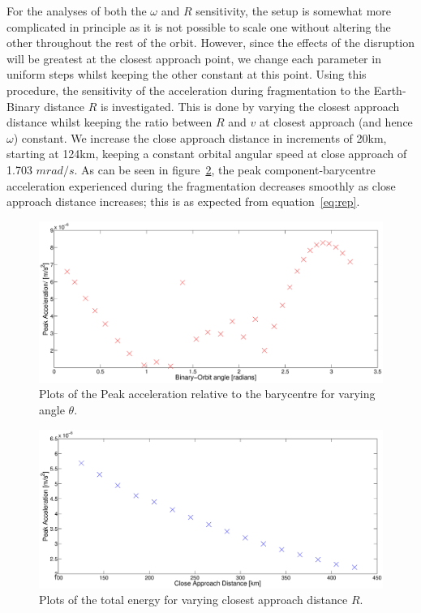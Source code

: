 \documentclass[letterpaper, preprint, paper,11pt]{AAS}	%
\begin{document}
For the analyses of both the $\omega$ and $R$ sensitivity, the setup is somewhat more complicated in principle as it is not possible to scale one without altering the other throughout the rest of the orbit. However, since the effects of the disruption will be greatest at the closest approach point, we change each parameter in uniform steps whilst keeping the other constant at this point. 
Using this procedure, the sensitivity of the acceleration during fragmentation to the Earth-Binary distance $R$ is investigated. This is done by varying the closest approach distance whilst keeping the ratio between $R$ and $v$ at closest approach (and hence $\omega$) constant. We increase the close approach distance in increments of 20km, starting at 124km, keeping a constant orbital angular speed at close approach of 1.703 $mrad/s$. As can be seen in figure~\ref{fig:Rsens}, the peak component-barycentre acceleration experienced during the fragmentation decreases smoothly as close approach distance increases; this is as expected from equation~\ref{eq:rep}.
 \begin{figure}[H]
\centering
\centerline{\includegraphics[width=1.0\textwidth]{theta_sens.eps}} 
\caption{Plots of the Peak acceleration relative to the barycentre for varying angle $\theta$.} 
\label{fig:theta}
\end{figure}
\begin{figure}[H]
\centering
\centerline{\includegraphics[width=1.2\textwidth]{Rsens_accel_1.eps}} 
\caption{Plots of the total energy for varying closest approach distance $R$.} 
\label{fig:Rsens}
\end{figure} 
\end{document}
